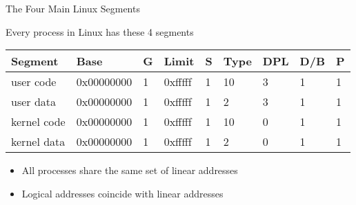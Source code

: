 \begin{frame}{The Four Main Linux Segments}
  \begin{iblock}{Every process in Linux has these 4 segments}
    \begin{center}\ttfamily
      \begin{tabular}{*{9}l}
        \hline
        Segment&Base&G&Limit&S&Type&DPL&D/B&P\\\hline
        user code&0x00000000&1&0xfffff&1&10&3&1&1\\
        user data&0x00000000&1&0xfffff&1&2&3&1&1\\
        kernel code&0x00000000&1&0xfffff&1&10&0&1&1\\
        kernel data&0x00000000&1&0xfffff&1&2&0&1&1\\\hline
      \end{tabular}
    \end{center}
  \end{iblock}
  \begin{itemize}
  \item All processes share the same set of linear addresses
  \item Logical addresses coincide with linear addresses
  \end{itemize}
\end{frame}


